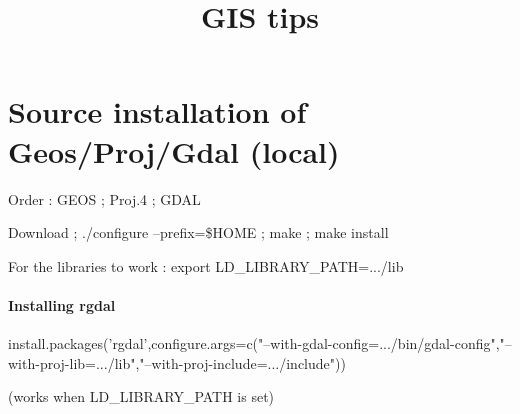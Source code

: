 


\title{GIS tips}



\date{}


\maketitle

\justify

\renewcommand{\abstractname}{}

\begin{abstract}

\end{abstract}




\section*{Source installation of Geos/Proj/Gdal (local)}

Order : GEOS ; Proj.4 ; GDAL

Download ; ./configure --prefix={\$}HOME ; make ; make install

For the libraries to work : export LD_LIBRARY_PATH=.../lib

\paragraph{Installing rgdal}

install.packages('rgdal',configure.args=c("--with-gdal-config=.../bin/gdal-config","--with-proj-lib=.../lib","--with-proj-include=.../include"))

(works when LD_LIBRARY_PATH is set)


















